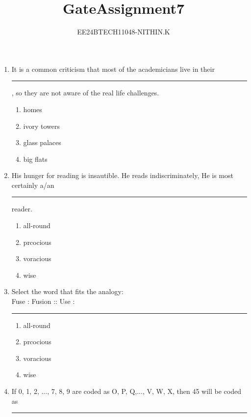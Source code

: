 \documentclass[journal]{IEEEtran}
\numberwithin{equation}{enumi}
\numberwithin{figure}{enumi}
\begin{document}


\title{GateAssignment7}
\author{EE24BTECH11048-NITHIN.K} 
{\let\newpage\relax\maketitle}
\begin{enumerate}
\section{Q.1 - Q.5 carry one mark each}
\item It is a common criticism that most of the academicians live in their \rule{1cm}{0.4pt}, so they are not aware of the real life challenges.
	\begin{enumerate}
		\item homes
		\item ivory towers
		\item glass palaces
		\item big flats
	\end{enumerate}
\item His hunger for reading is insautible. He reads indiscriminately, He is most certainly a/an \rule{1cm}{0.4pt} reader.
	\begin{enumerate}
                \item all-round
                \item prcocious
                \item voracious
                \item wise
        \end{enumerate}
\item Select the word that fits the analogy: \\
	Fuse : Fusion :: Use : \rule{1cm}{0.4pt}
	\begin{enumerate}
                \item all-round
                \item prcocious
                \item voracious
                \item wise
        \end{enumerate}
\item If 0, 1, 2, ..., 7, 8, 9 are coded as O, P, Q,..., V, W, X, then 45 will be coded as \rule{1cm}{0.4pt}

\end{enumerate}
\end{document}
